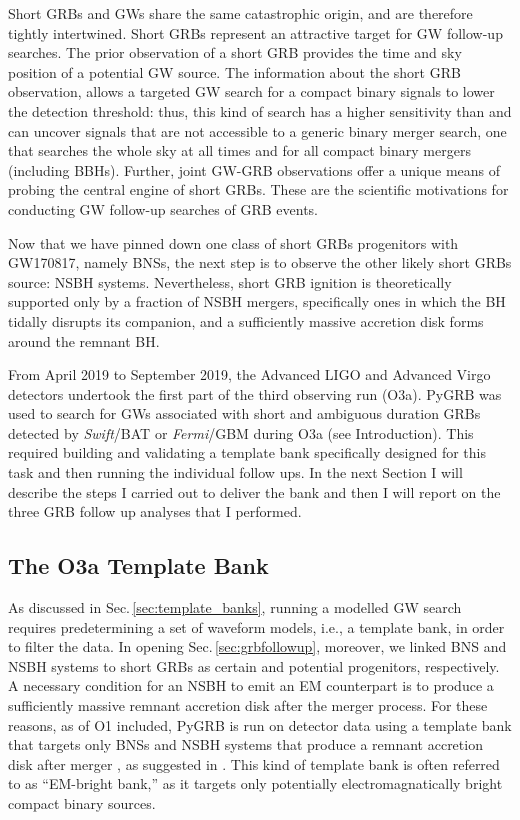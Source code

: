\documentclass[binding=0.6cm, LaM]{sapthesis}
\begin{document}
	Short GRBs and GWs 
	share the same catastrophic origin, 
	and are therefore tightly intertwined.
	Short GRBs represent an attractive target for GW follow-up searches. 
	The prior observation of a short GRB provides the time and sky position of a potential GW source. 
	The information about the short GRB observation, allows a targeted GW search for a compact binary signals to lower the detection threshold: thus,
        this kind of search has a higher sensitivity than
        and can uncover signals that are not accessible to
        a generic binary merger search, one that searches the whole sky at all times and for all compact binary mergers (including BBHs).
        Further, joint GW-GRB observations offer a unique means of probing the central engine of short GRBs.
        These are the scientific motivations for conducting GW follow-up searches of GRB events.

	Now that we have pinned down one class of short GRBs progenitors with GW170817, namely BNSs, 
	the next step is to observe the other likely short GRBs source: NSBH systems.
	Nevertheless, short GRB ignition is theoretically supported only by a fraction of NSBH mergers,
	specifically ones in which the BH tidally disrupts its companion, 
	and a sufficiently massive accretion disk forms around the remnant BH.

	From April 2019 to September 2019, the Advanced LIGO and Advanced Virgo detectors undertook 
	the first part of the third observing run (O3a).
	{\rm PyGRB} was used to search for GWs associated with short and ambiguous duration GRBs detected by {\it Swift}/BAT or {\it Fermi}/GBM during O3a (see Introduction).
	This required building and validating a template bank specifically designed for this task and then running the individual follow ups.  In the next Section I will describe the steps I carried out to deliver the bank and then I will report on the three GRB follow up analyses that I performed.

\subsection{The O3a Template Bank}
\label{subsec:o3aTemplateBank}
	As discussed in Sec.\,\ref{sec:template_banks}, running a modelled GW search 
	requires predetermining a set of waveform models, i.e., a template bank, in order to filter the data. 
	In opening Sec.\,\ref{sec:grbfollowup}, moreover, we linked BNS and NSBH systems to short GRBs as certain and potential progenitors, respectively.
	A necessary condition for an NSBH to emit an EM counterpart
	is to produce a sufficiently massive remnant accretion disk after the merger process.
	For these reasons, as of O1 included, {\ttfamily PyGRB} is run on detector data using a template bank
	that targets only BNSs and NSBH systems that produce a remnant accretion disk after merger \cite{55,136,161}, as suggested in \cite{162}.  This kind of template bank is often referred to as ``EM-bright bank,'' as it targets only potentially electromagnatically bright compact binary sources.
\end{document}
